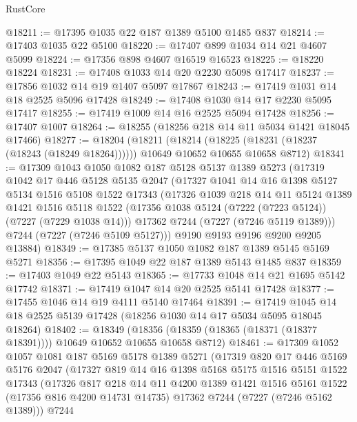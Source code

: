 \begin{lexlean}{RustCore}
\begin{coremodule}
@18211 := @17395 @1035 @22 @187 @1389 @5100 @1485 @837
@18214 := @17403 @1035 @22 @5100
@18220 := @17407 @899 @1034 @14 @21 @4607 @5099
@18224 := @17356 @898 @4607 @16519 @16523
@18225 := @18220 @18224
@18231 := @17408 @1033 @14 @20 @2230 @5098 @17417
@18237 := @17856 @1032 @14 @19 @1407 @5097 @17867
@18243 := @17419 @1031 @14 @18 @2525 @5096 @17428
@18249 := @17408 @1030 @14 @17 @2230 @5095 @17417
@18255 := @17419 @1009 @14 @16 @2525 @5094 @17428
@18256 := @17407 @1007
@18264 := @18255 (@18256 @218 @14 @11 @5034 @1421 @18045 @17466)
@18277 := @18204
    (@18211
      (@18214 (@18225 (@18231 (@18237 (@18243 (@18249 @18264))))))
      @10649
      @10652
      @10655
      @10658
      @8712)
@18341 := @17309
    @1043
    @1050
    @1082
    @187
    @5128
    @5137
    @1389
    @5273
    (@17319
      @1042
      @17
      @446
      @5128
      @5135
      @2047
      (@17327
        @1041
        @14
        @16
        @1398
        @5127
        @5134
        @1516
        @5108
        @1522
        @17343
        (@17326
          @1039
          @218
          @14
          @11
          @5124
          @1389
          @1421
          @1516
          @5118
          @1522
          (@17356 @1038 @5124 (@7222 (@7223 @5124)) (@7227 (@7229 @1038 @14)))
          @17362
          @7244
          (@7227 (@7246 @5119 @1389)))
        @7244
        (@7227 (@7246 @5109 @5127)))
      @9190
      @9193
      @9196
      @9200
      @9205
      @13884)
@18349 := @17385 @5137 @1050 @1082 @187 @1389 @5145 @5169 @5271
@18356 := @17395 @1049 @22 @187 @1389 @5143 @1485 @837
@18359 := @17403 @1049 @22 @5143
@18365 := @17733 @1048 @14 @21 @1695 @5142 @17742
@18371 := @17419 @1047 @14 @20 @2525 @5141 @17428
@18377 := @17455 @1046 @14 @19 @4111 @5140 @17464
@18391 := @17419 @1045 @14 @18 @2525 @5139 @17428 (@18256 @1030 @14 @17 @5034 @5095 @18045 @18264)
@18402 := @18349
    (@18356 (@18359 (@18365 (@18371 (@18377 @18391)))) @10649 @10652 @10655 @10658 @8712)
@18461 := @17309
    @1052
    @1057
    @1081
    @187
    @5169
    @5178
    @1389
    @5271
    (@17319
      @820
      @17
      @446
      @5169
      @5176
      @2047
      (@17327
        @819
        @14
        @16
        @1398
        @5168
        @5175
        @1516
        @5151
        @1522
        @17343
        (@17326
          @817
          @218
          @14
          @11
          @4200
          @1389
          @1421
          @1516
          @5161
          @1522
          (@17356 @816 @4200 @14731 @14735)
          @17362
          @7244
          (@7227 (@7246 @5162 @1389)))
        @7244

\end{coremodule}
\end{lexlean}
